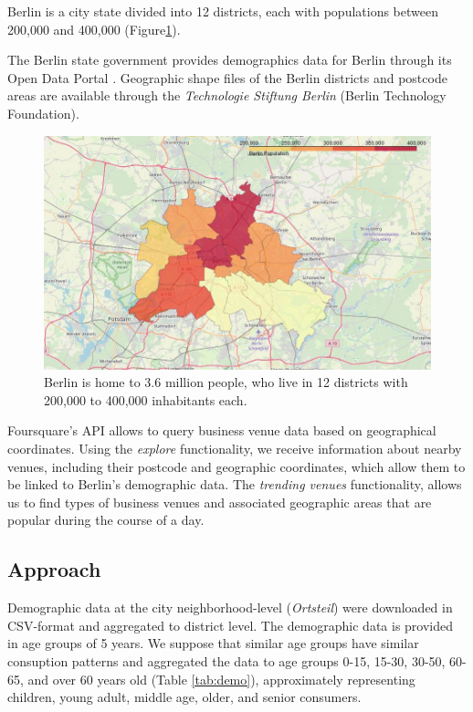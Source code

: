 \documentclass[letter]{scrartcl}
\begin{document}
Berlin is a city state divided into 12 districts, each with populations between 200,000 and 400,000 (Figure\ref{fig:Berlin}).  

The Berlin state government provides demographics data for Berlin through its Open Data Portal \cite{Dem}. Geographic shape files of the Berlin districts \cite{Bez} and postcode \cite{PLZ} areas are available through the \emph{Technologie Stiftung Berlin} (Berlin Technology Foundation). 

\begin{figure}[h]
\centering
\includegraphics[width=12cm]{./Berlin_Pop.JPG}
\caption{Berlin is home to 3.6 million people, who live in 12 districts with 200,000 to 400,000 inhabitants each.}\label{fig:Berlin}
\end{figure}

Foursquare's API \cite{FS} allows to query business venue data based on geographical coordinates. Using the \emph{explore} functionality, we receive information about nearby venues, including their postcode and geographic coordinates, which allow them to be linked to Berlin's demographic data. The \emph{trending venues} functionality, allows us to find types of business venues and associated geographic areas that are popular during the course of a day. 

\subsection{Approach}

Demographic data at the city neighborhood-level (\emph{Ortsteil}) were downloaded in CSV-format and aggregated to district level. The demographic data is provided in age groups of 5 years. We suppose that similar age groups have similar consuption patterns and aggregated the data to age groups 0-15, 15-30, 30-50, 60-65, and over 60 years old (Table \ref{tab:demo}), approximately representing children, young adult, middle age, older, and senior consumers. 
\end{document}
